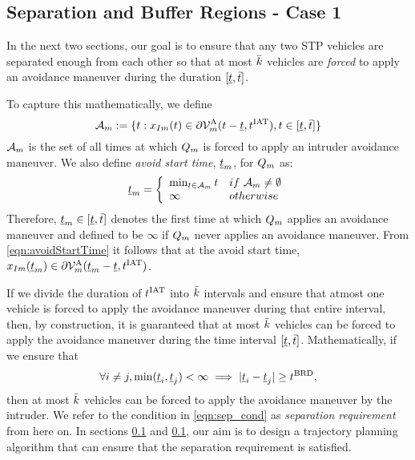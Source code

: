 \subsection{Separation and Buffer Regions - Case 1} \label{sec:case1}
In the next two sections, our goal is to ensure that any two STP vehicles are separated enough from each other so that %
at most $\bar{k}$ vehicles are \textit{forced} to apply an avoidance maneuver during the duration $[\underline{t}, \bar{t}]$.  

To capture this mathematically, we define 
\begin{equation} \label{eqn:avoidStartTime}
\avoidt_{m} := \{t: \state_{\intr m}(t) \in \partial\brs^{\text{A}}_{m}(t-\tsa, \iat), t \in [\tsa, \tea]\}
\end{equation} 
$\mathcal{A}_{m}$ is the set of all times at which $Q_m$ is forced to apply an intruder avoidance maneuver. We also define \textit{avoid start time}, $\underline{t}_m$, for $Q_m$ as:
\begin{equation} \label{eqn:avoidStartTime2}
\tsa_m  = 
\left \{ 
\begin{array}{ll}
\min_{t \in  \avoidt_{m}} t & \mbox{if~} \avoidt_{m} \neq \emptyset\\
\infty & \mbox{otherwise}
\end{array}
\right.
\end{equation}  
Therefore, $\underline{t}_m \in [\underline{t}, \bar{t}]$ denotes the first time at which $Q_m$ applies an avoidance maneuver and defined to be $\infty$ if $Q_m$ never applies an avoidance maneuver. From \eqref{eqn:avoidStartTime} it follows that at the avoid start time, $x_{I m}(\underline{t}_m) \in  \partial\mathcal{V}^{\text{A}}_{m}(\underline{t}_m-\underline{t}, t^\text{IAT})$. %
 
If we divide the duration of $t^\text{IAT}$ into $\bar{k}$ intervals and ensure that atmost one vehicle is forced to apply the avoidance maneuver during that entire interval, then, by construction, it is guaranteed that at most $\bar{k}$ vehicles can be forced to apply the avoidance maneuver during the time interval $[\underline{t}, \bar{t}]$. Mathematically, if we ensure that 
\begin{equation} \label{eqn:sep_cond}
\forall i \neq j, \min(\tsa_i, \tsa_j)< \infty \implies |\tsa_i - \tsa_j| \geq \brd,
\end{equation}
then at most $\bar{k}$ vehicles can be forced to apply the avoidance maneuver by the intruder. We refer to the condition in \eqref{eqn:sep_cond} as \textit{separation requirement} from here on. In sections \ref{sec:case1} and \ref{sec:case1}, our aim is to design a trajectory planning algorithm that can ensure that the separation requirement is satisfied.   

